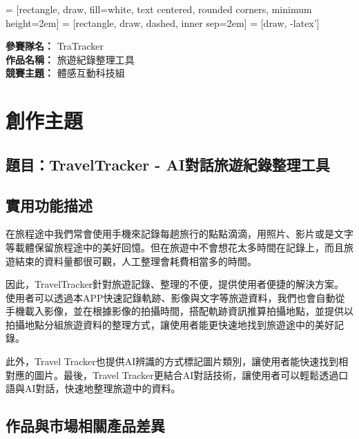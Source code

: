 \documentclass[12pt]{article}
\begin{document}
\date{}
\usetikzlibrary{automata, positioning, arrows, shapes, fit}
{}
 = [rectangle, draw, fill=white, 
    text centered, rounded corners, minimum height=2em]
 = [rectangle, draw, dashed, inner sep=2em]
 = [draw, -latex']
\setlength{\parindent}{2em}

\noindent
\textbf{參賽隊名：} TraTracker \\
\textbf{作品名稱：} 旅遊紀錄整理工具 \\
\textbf{競賽主題：} 體感互動科技組

\section{創作主題}

\subsection{題目：TravelTracker - AI對話旅遊紀錄整理工具}

\subsection{實用功能描述}

在旅程途中我們常會使用手機來記錄每趟旅行的點點滴滴，用照片、影片或是文字等載體保留旅程途中的美好回憶。但在旅遊中不會想花太多時間在記錄上，而且旅遊結束的資料量都很可觀，人工整理會耗費相當多的時間。

因此，TravelTracker針對旅遊記錄、整理的不便，提供使用者便捷的解決方案。使用者可以透過本APP快速記錄軌跡、影像與文字等旅遊資料，我們也會自動從手機載入影像，並在根據影像的拍攝時間，搭配軌跡資訊推算拍攝地點，並提供以拍攝地點分組旅遊資料的整理方式，讓使用者能更快速地找到旅遊途中的美好記錄。

此外，Travel Tracker也提供AI辨識的方式標記圖片類別，讓使用者能快速找到相對應的圖片。最後，Travel Tracker更結合AI對話技術，讓使用者可以輕鬆透過口語與AI對話，快速地整理旅遊中的資料。

\subsection{作品與市場相關產品差異}
\end{document}
